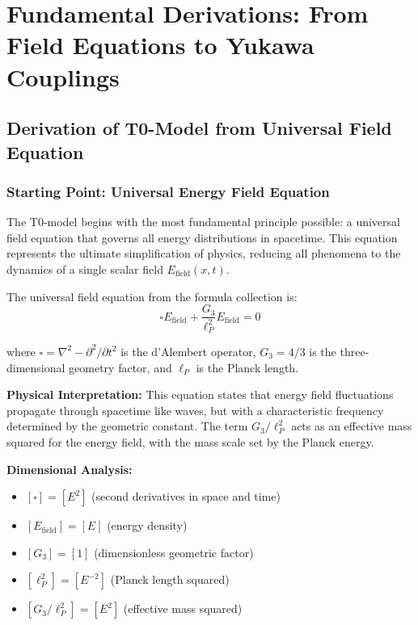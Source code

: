 \documentclass[12pt,a4paper]{article}
\newcommand{\Efield}{E_{\text{field}}}
\begin{document}
	\section{Fundamental Derivations: From Field Equations to Yukawa Couplings}
	
	\subsection{Derivation of T0-Model from Universal Field Equation}
	
	\subsubsection{Starting Point: Universal Energy Field Equation}
	
	The T0-model begins with the most fundamental principle possible: a universal field equation that governs all energy distributions in spacetime. This equation represents the ultimate simplification of physics, reducing all phenomena to the dynamics of a single scalar field $E_{\text{field}}(x,t)$.
	
	The universal field equation from the formula collection is:
	\begin{equation}
		\boxed{\square \Efield + \frac{G_3}{\ell_P^2} \Efield = 0}
	\end{equation}
	
	where $\square = \nabla^2 - \partial^2/\partial t^2$ is the d'Alembert operator, $G_3 = 4/3$ is the three-dimensional geometry factor, and $\ell_P$ is the Planck length.
	
	\textbf{Physical Interpretation:} This equation states that energy field fluctuations propagate through spacetime like waves, but with a characteristic frequency determined by the geometric constant. The term $G_3/\ell_P^2$ acts as an effective mass squared for the energy field, with the mass scale set by the Planck energy.
	
	\textbf{Dimensional Analysis:}
	\begin{itemize}
		\item $[\square] = [E^2]$ (second derivatives in space and time)
		\item $[\Efield] = [E]$ (energy density)
		\item $[G_3] = [1]$ (dimensionless geometric factor)
		\item $[\ell_P^2] = [E^{-2}]$ (Planck length squared)
		\item $[G_3/\ell_P^2] = [E^2]$ (effective mass squared)
	\end{itemize}
	
\end{document}
